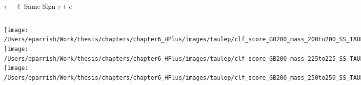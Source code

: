 \documentclass[aspectratio=169,xcolor=table]{beamer}
\begin{document}
    \begin{frame}[t]{$\tau+\ell$ Same Sign $\tau+e$}
      \begin{columns}[t]
          \texttt{[image: /Users/eparrish/Work/thesis/chapters/chapter6\_HPlus/images/taulep/clf\_score\_GB200\_mass\_200to200\_SS\_TAUEL.png]}
          \texttt{[image: /Users/eparrish/Work/thesis/chapters/chapter6\_HPlus/images/taulep/clf\_score\_GB200\_mass\_225to225\_SS\_TAUEL.png]}
          \texttt{[image: /Users/eparrish/Work/thesis/chapters/chapter6\_HPlus/images/taulep/clf\_score\_GB200\_mass\_250to250\_SS\_TAUEL.png]}

          \texttt{[image: /Users/eparrish/Work/thesis/chapters/chapter6\_HPlus/images/taulep/clf\_score\_GB200\_mass\_275to275\_SS\_TAUEL.png]}
          \texttt{[image: /Users/eparrish/Work/thesis/chapters/chapter6\_HPlus/images/taulep/clf\_score\_GB200\_mass\_300to300\_SS\_TAUEL.png]}
          \texttt{[image: /Users/eparrish/Work/thesis/chapters/chapter6\_HPlus/images/taulep/clf\_score\_GB200\_mass\_350to350\_SS\_TAUEL.png]}

          \texttt{[image: /Users/eparrish/Work/thesis/chapters/chapter6\_HPlus/images/taulep/clf\_score\_GB200\_mass\_400to400\_SS\_TAUEL.png]}
          \texttt{[image: /Users/eparrish/Work/thesis/chapters/chapter6\_HPlus/images/taulep/clf\_score\_GB200\_mass\_500to500\_SS\_TAUEL.png]}
          \texttt{[image: /Users/eparrish/Work/thesis/chapters/chapter6\_HPlus/images/taulep/clf\_score\_GB200\_mass\_600to600\_SS\_TAUEL.png]}

          \texttt{[image: /Users/eparrish/Work/thesis/chapters/chapter6\_HPlus/images/taulep/clf\_score\_GB200\_mass\_700to700\_SS\_TAUEL.png]}
          \texttt{[image: /Users/eparrish/Work/thesis/chapters/chapter6\_HPlus/images/taulep/clf\_score\_GB200\_mass\_800to800\_SS\_TAUEL.png]}
          \texttt{[image: /Users/eparrish/Work/thesis/chapters/chapter6\_HPlus/images/taulep/clf\_score\_GB200\_mass\_900to900\_SS\_TAUEL.png]}

      \end{columns}
    \end{frame}
\end{document}
